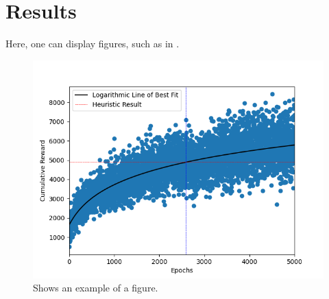 \section{Results}

Here, one can display figures, such as in .

\begin{figure}
    \centering
    \includegraphics[width=\singlefigure]{figures/figure_2.png}
    \caption{\label{fig:example} Shows an example of a figure.}
\end{figure}